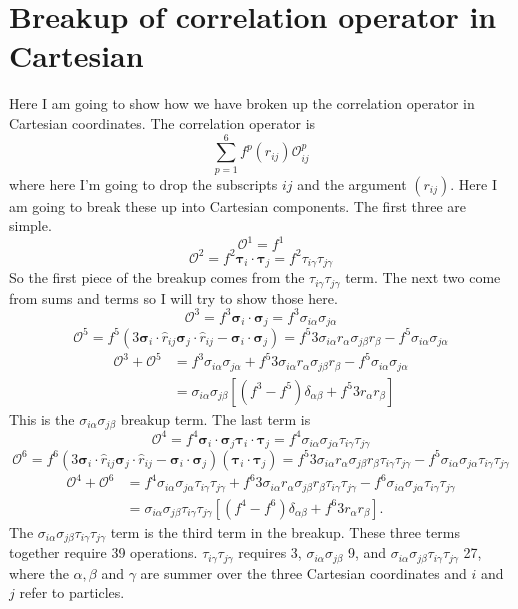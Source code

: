 \documentclass[12pt]{extarticle}
\newcommand{\Oijp}{\mathcal{O}^p_{ij}}
\newcommand{\taui}{\bm{\tau}_i}
\newcommand{\tauj}{\bm{\tau}_j}
\newcommand{\sigmai}{\bm{\sigma}_i}
\newcommand{\sigmaj}{\bm{\sigma}_j}
\newcommand{\rij}{\hat{r}_{ij}}
\newcommand{\sigmaia}{\sigma_{i\alpha}}
\newcommand{\tauig}{\tau_{i\gamma}}
\newcommand{\sigmaja}{\sigma_{j\alpha}}
\newcommand{\sigmajb}{\sigma_{j\beta}}
\newcommand{\taujg}{\tau_{j\gamma}}
\begin{document}
\section{Breakup of correlation operator in Cartesian}
Here I am going to show how we have broken up the correlation operator in Cartesian coordinates. The correlation operator is
\begin{equation}
  \sum_{p=1}^6 f^p(r_{ij}) \Oijp
\end{equation}
where here I'm going to drop the subscripts $ij$ and the argument $(r_{ij})$. Here I am going to break these up into Cartesian components. The first three are simple.
\begin{equation}
  \mathcal{O}^1 = f^1
  \label{equ:central}
\end{equation}
\begin{equation}
  \mathcal{O}^2 = f^2 \taui \cdot \tauj = f^2 \tauig \taujg
  \label{equ:At}
\end{equation}
So the first piece of the breakup comes from the $\tauig \taujg$ term. The next two come from sums and terms so I will try to show those here.
\begin{equation}
  \mathcal{O}^3 = f^3\sigmai\cdot\sigmaj = f^3\sigmaia\sigmaja
\end{equation}
\begin{equation}
  \mathcal{O}^5 = f^5 \left( 3\sigmai\cdot\rij\sigmaj\cdot\rij - \sigmai\cdot\sigmaj \right) = f^5 3\sigmaia r_\alpha\sigmajb r_\beta - f^5 \sigmaia\sigmaja
\end{equation}
\begin{align}
  \mathcal{O}^3 + \mathcal{O}^5 &= f^3 \sigmaia\sigmaja + f^5 3\sigmaia r_\alpha\sigmajb r_\beta - f^5 \sigmaia\sigmaja \\
  &= \sigmaia\sigmajb \left[ (f^3-f^5)\delta_{\alpha\beta} + f^5 3r_\alpha r_\beta \right]
  \label{equ:As}
\end{align}
This is the $\sigmaia\sigmajb$ breakup term. The last term is
\begin{equation}
  \mathcal{O}^4 = f^4\sigmai\cdot\sigmaj\taui\cdot\tauj = f^4\sigmaia\sigmaja\tauig\taujg
\end{equation}
\begin{equation}
  \mathcal{O}^6 = f^6 \left( 3\sigmai\cdot\rij\sigmaj\cdot\rij - \sigmai\cdot\sigmaj \right)(\taui\cdot\tauj) = f^5 3\sigmaia r_\alpha\sigmajb r_\beta\tauig\taujg - f^5 \sigmaia\sigmaja\tauig\taujg
\end{equation}
\begin{align}
  \mathcal{O}^4 + \mathcal{O}^6 &= f^4 \sigmaia\sigmaja\tauig\taujg + f^6 3\sigmaia r_\alpha\sigmajb r_\beta\tauig\taujg - f^6 \sigmaia\sigmaja\tauig\taujg \\
  &= \sigmaia\sigmajb\tauig\taujg \left[ (f^4-f^6)\delta_{\alpha\beta} + f^6 3r_\alpha r_\beta \right].
  \label{equ:Ast}
\end{align}
The $\sigmaia\sigmajb\tauig\taujg$ term is the third term in the breakup. These three terms together require 39 operations. $\tauig\taujg$ requires 3, $\sigmaia\sigmajb$ 9, and $\sigmaia\sigmajb\tauig\taujg$ 27, where the $\alpha, \beta$ and $\gamma$ are summer over the three Cartesian coordinates and $i$ and $j$ refer to particles.
\end{document}
